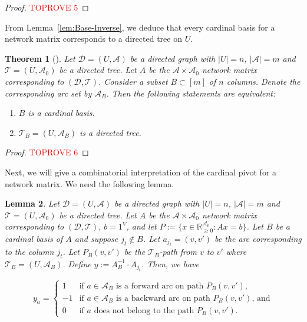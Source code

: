 \documentclass[11pt]{article}
\newcommand{\R}{\mathbb{R}}
\newtheorem{theorem}{Theorem}
\newtheorem{lemma}[theorem]{Lemma}
\begin{document}
\begin{proof}\textcolor{red}{TOPROVE 5}\end{proof}



From Lemma~\ref{lem:Base-Inverse}, we deduce that every cardinal basis for a network matrix corresponds to a directed tree on $U$.

\begin{theorem}[\cite{schrijver1998theory}]\label{lem:Base-SpanningTree}
Let $\mathcal{D}=(U,\mathcal{A})$ be a directed graph with $|U|=n$, $|\mathcal{A}|=m$ and $\mathcal{T}=(U,\mathcal{A}_0)$ be a directed tree. Let $A$ be the $\mathcal{A}\times \mathcal{A}_0$ network matrix corresponding to $(\mathcal{D},\mathcal{T})$. Consider a subset $B\subset [m]$ of $n$ columns. Denote the corresponding arc set by $\mathcal{A}_B$. Then the following statements are equivalent:
    \begin{enumerate}
        \item[(i)] $B$ is a cardinal basis. \item[(ii)] $\mathcal{T}_B=(U,\mathcal{A}_B)$ is a directed tree.
    \end{enumerate}
\end{theorem}

\begin{proof}\textcolor{red}{TOPROVE 6}\end{proof}

\medskip










Next, we will give a combinatorial interpretation of the cardinal pivot for a network matrix. We need the following lemma. 

\begin{lemma}\label{lem:Forward-Backward-Formula}
Let $\mathcal{D}=(U,\mathcal{A})$ be a directed graph with $|U|=n$, $|\mathcal{A}|=m$ and $\mathcal{T}=(U,\mathcal{A}_0)$ be a directed tree. Let $A$ be the $\mathcal{A}\times \mathcal{A}_0$ network matrix corresponding to $(\mathcal{D},\mathcal{T})$, $b=1^V$, and let $P:=\{x\in \R^{\mathcal{A}_0}_{\ge 0}: Ax=b \}$. 
Let $B$ be a cardinal basis of $A$ and suppose $j_t\notin B$. Let $a_{j_t}=(v,v')$ be the arc corresponding to the column $j_t$. Let $P_B(v,v')$ be the $\mathcal{T}_B$-path from $v$ to $v'$ where $\mathcal{T}_B=(U,\mathcal{A}_B)$. Define $y:=A_B^{-1}\cdot A_{j_t}$. Then, we have

    \begin{equation}\label{eq:Forward-Backward-Formula}
    y_a=\left\{
    \begin{array}{cc}
        1 & \textrm{if $a\in\mathcal{A}_B$ is a forward arc on path $P_B(v,v')$,}\\
        -1 & \textrm{if $a\in\mathcal{A}_B$ is a backward arc on path $P_B(v,v')$, and} \\
        0 & \textrm{if $a$ does not belong to the path $P_B(v,v')$.}
    \end{array}
    \right.
\end{equation}
\end{lemma}
\end{document}
